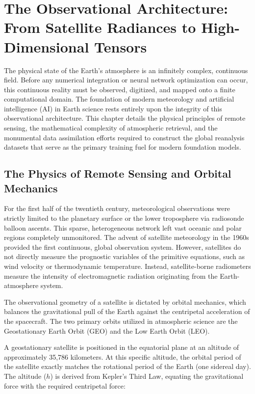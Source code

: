 \chapter{The Observational Architecture: From Satellite Radiances to High-Dimensional Tensors}

The physical state of the Earth's atmosphere is an infinitely complex, continuous field. Before any numerical integration or neural network optimization can occur, this continuous reality must be observed, digitized, and mapped onto a finite computational domain. The foundation of modern meteorology and artificial intelligence (AI) in Earth science rests entirely upon the integrity of this observational architecture. This chapter details the physical principles of remote sensing, the mathematical complexity of atmospheric retrieval, and the monumental data assimilation efforts required to construct the global reanalysis datasets that serve as the primary training fuel for modern foundation models.

\section{The Physics of Remote Sensing and Orbital Mechanics}

For the first half of the twentieth century, meteorological observations were strictly limited to the planetary surface or the lower troposphere via radiosonde balloon ascents. This sparse, heterogeneous network left vast oceanic and polar regions completely unmonitored. The advent of satellite meteorology in the 1960s provided the first continuous, global observation system. However, satellites do not directly measure the prognostic variables of the primitive equations, such as wind velocity or thermodynamic temperature. Instead, satellite-borne radiometers measure the intensity of electromagnetic radiation originating from the Earth-atmosphere system.

The observational geometry of a satellite is dictated by orbital mechanics, which balances the gravitational pull of the Earth against the centripetal acceleration of the spacecraft. The two primary orbits utilized in atmospheric science are the Geostationary Earth Orbit (GEO) and the Low Earth Orbit (LEO).

A geostationary satellite is positioned in the equatorial plane at an altitude of approximately 35,786 kilometers. At this specific altitude, the orbital period of the satellite exactly matches the rotational period of the Earth (one sidereal day). The altitude ($h$) is derived from Kepler's Third Law, equating the gravitational force with the required centripetal force:

